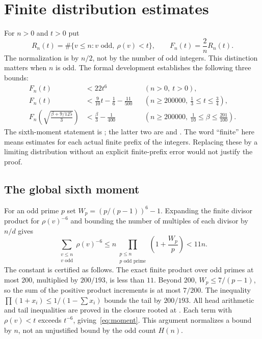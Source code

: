 \section{Finite distribution estimates}\label{sec:cdf}
For $n>0$ and $t>0$ put
\[
 R_n(t)=\#\{v\le n:v\text{ odd},\ \rho(v)<t\},\qquad
 F_n(t)=\frac2n R_n(t).
\]
The normalization is by $n/2$, not by the number of odd integers. This distinction matters when $n$ is odd. The formal development establishes the following three bounds:
\begin{align}
 F_n(t)&<22t^6 &&(n>0,\ t>0),\label{eq:moment}\\
 F_n(t)&<\frac9{10}t-\frac16-\frac{11}{500}
 &&\left(n\ge200000,\ \frac13\le t\le\frac34\right),\label{eq:cdfhigh}\\
 F_n\left(\sqrt{\frac{\beta+9/125}{3}}\right)
 &<\frac\beta3-\frac1{400}
 &&\left(n\ge200000,\ \frac1{10}\le\beta\le\frac{201}{100}\right).
 \label{eq:cdflow}
\end{align}
The sixth-moment statement is ; the latter two are  and . The word ``finite'' here means estimates for each actual finite prefix of the integers. Replacing these by a limiting distribution without an explicit finite-prefix error would not justify the proof.

\subsection{The global sixth moment}
For an odd prime $p$ set $W_p=(p/(p-1))^6-1$. Expanding the finite divisor product for $\rho(v)^{-6}$ and bounding the number of multiples of each divisor by $n/d$ gives
\[
 \sum_{\substack{v\le n\\v\text{ odd}}}\rho(v)^{-6}
 \le n\prod_{\substack{p\le n\\p\text{ odd prime}}}\left(1+\frac{W_p}{p}\right)<11n.
\]
The constant is certified as follows. The exact finite product over odd primes at most $200$, multiplied by $200/193$, is less than $11$. Beyond $200$, $W_p\le7/(p-1)$, so the sum of the positive product increments is at most $7/200$. The inequality $\prod(1+x_i)\le1/(1-\sum x_i)$ bounds the tail by $200/193$. All head arithmetic and tail inequalities are proved in the closure rooted at . Each term with $\rho(v)<t$ exceeds $t^{-6}$, giving~\eqref{eq:moment}. This argument normalizes a bound by $n$, not an unjustified bound by the odd count $H(n)$.

